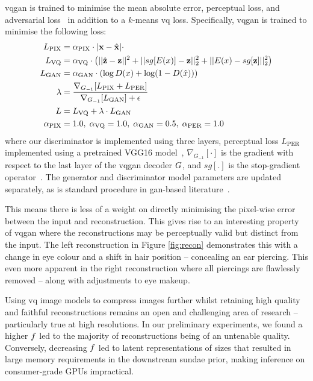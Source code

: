 \Gls{vqgan} is trained to minimise the mean absolute error, perceptual loss, and 
adversarial loss~\cite{esser2021taming} in addition to a $k$-means \gls{vq}
loss. Specifically, \gls{vqgan} is trained to minimise the following
loss:
\begin{align}
\begin{split}
    L_\text{PIX} &= \alpha_\text{PIX} \cdot |\mathbf{x} - \hat{\mathbf{x}}| \cdot \\
    L_\text{VQ} &= \alpha_\text{VQ} \cdot \left(||\hat{\mathbf{z}} -
    \mathbf{z}||^2 + ||sg[E(x)] - \mathbf{z}||^2_2 + ||E(x) -
    sg[\mathbf{z}]||^2_2\right)\\
    L_\text{GAN} &= \alpha_\text{GAN} \cdot \left(\log D(x) + \log
    (1-D(\hat{x}))\right) \\
    \lambda &= \frac{\nabla_{G_{-1}}[L_\text{PIX} +
    L_\text{PER}]}{\nabla_{G_{-1}}[L_\text{GAN}] + \epsilon}\\
    L &= L_\text{VQ} + \lambda \cdot L_\text{GAN}\\
    \alpha_\text{PIX} &= 1.0,\; \alpha_\text{VQ} = 1.0,\; \alpha_\text{GAN} = 0.5,\; \alpha_\text{PER} = 1.0
\end{split}
\end{align}
\cite{esser2021taming} where our discriminator is implemented using three
layers, perceptual loss $L_\text{PER}$ implemented using a pretrained VGG16
model~\cite{karen2014vg18}, $\nabla_{G_{-1}}[\cdot]$ is the gradient with
respect to the last layer of the \gls{vqgan} decoder $G$, and
$sg[.]$ is the stop-gradient operator~\cite{oord2017vqvae}. The
generator and discriminator model parameters are updated separately, as is
standard procedure in \gls{gan}-based literature~\cite{esser2021taming}.

This means there is less of a weight on directly minimising the pixel-wise error
between the input and reconstruction. This gives rise to an interesting property
of \gls{vqgan} where the reconstructions may be perceptually valid but 
distinct from the input. The left reconstruction in Figure \ref{fig:recon}
demonstrates this with a change in eye colour and a shift in hair position --
concealing an ear piercing. This even more apparent in the right reconstruction
where all piercings are flawlessly removed -- along with adjustments to eye
makeup.

Using \gls{vq} image models to compress images further whilst retaining high
quality and faithful reconstructions remains an open and challenging area of
research -- particularly true at high resolutions. In our preliminary
experiments, we found a higher $f$ led to the majority of
reconstructions being of an untenable quality. Conversely, decreasing
$f$ led to latent representations of sizes that resulted in large
memory requirements in the downstream \gls{sundae} prior, making inference on
consumer-grade GPUs impractical.

